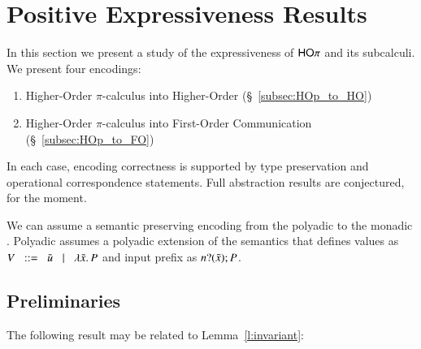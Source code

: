 \section{Positive Expressiveness Results}
In this section we present a study of the expressiveness of $\mathsf{HO}\pi$ and its subcalculi. 
We present four encodings:
%
\begin{enumerate}[1.]
	\item Higher-Order $\pi$-calculus into Higher-Order  (\S~\ref{subsec:HOp_to_HO})
	\item Higher-Order $\pi$-calculus into First-Order Communication (\S~\ref{subsec:HOp_to_FO})
\end{enumerate}
%
In each case, encoding correctness is supported by type preservation and operational correspondence statements.
Full abstraction results are conjectured, for the moment.

\begin{remark}
	We can assume a semantic preserving encoding from the polyadic
	\HOp to the monadic \HOp. Polyadic \HOp assumes a polyadic
	extension of the \HOp semantics that defines values as
	$V \;\;::=\;\; \tilde{u} \;\;\;|\;\;\; \lambda \tilde{x}.\,P$
	and input prefix as $n ? (\tilde{x}) ; P$.
\end{remark}

\subsection*{Preliminaries}

The following result may be related to Lemma~\ref{l:invariant}: 

